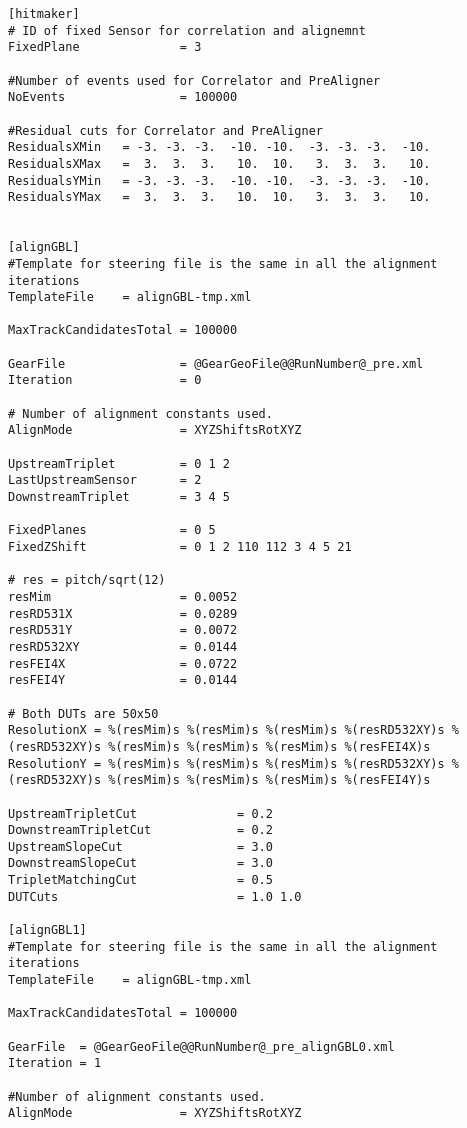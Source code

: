 \begin{lstlisting}[caption={Configuration file of EUTelescope for the testbeam anaylsis of June 2020 Batch 3}]
[hitmaker]
# ID of fixed Sensor for correlation and alignemnt
FixedPlane              = 3

#Number of events used for Correlator and PreAligner
NoEvents                = 100000

#Residual cuts for Correlator and PreAligner
ResidualsXMin   = -3. -3. -3.  -10. -10.  -3. -3. -3.  -10.
ResidualsXMax   =  3.  3.  3.   10.  10.   3.  3.  3.   10.
ResidualsYMin   = -3. -3. -3.  -10. -10.  -3. -3. -3.  -10.
ResidualsYMax   =  3.  3.  3.   10.  10.   3.  3.  3.   10.


[alignGBL]
#Template for steering file is the same in all the alignment iterations
TemplateFile    = alignGBL-tmp.xml

MaxTrackCandidatesTotal = 100000

GearFile                = @GearGeoFile@@RunNumber@_pre.xml
Iteration               = 0

# Number of alignment constants used.
AlignMode               = XYZShiftsRotXYZ

UpstreamTriplet         = 0 1 2
LastUpstreamSensor      = 2
DownstreamTriplet       = 3 4 5

FixedPlanes             = 0 5
FixedZShift             = 0 1 2 110 112 3 4 5 21

# res = pitch/sqrt(12)
resMim                  = 0.0052
resRD531X               = 0.0289
resRD531Y               = 0.0072
resRD532XY              = 0.0144
resFEI4X                = 0.0722
resFEI4Y                = 0.0144

# Both DUTs are 50x50
ResolutionX = %(resMim)s %(resMim)s %(resMim)s %(resRD532XY)s %(resRD532XY)s %(resMim)s %(resMim)s %(resMim)s %(resFEI4X)s
ResolutionY = %(resMim)s %(resMim)s %(resMim)s %(resRD532XY)s %(resRD532XY)s %(resMim)s %(resMim)s %(resMim)s %(resFEI4Y)s

UpstreamTripletCut              = 0.2
DownstreamTripletCut            = 0.2
UpstreamSlopeCut                = 3.0
DownstreamSlopeCut              = 3.0
TripletMatchingCut              = 0.5
DUTCuts                         = 1.0 1.0

[alignGBL1]
#Template for steering file is the same in all the alignment iterations
TemplateFile    = alignGBL-tmp.xml

MaxTrackCandidatesTotal = 100000

GearFile  = @GearGeoFile@@RunNumber@_pre_alignGBL0.xml
Iteration = 1

#Number of alignment constants used.
AlignMode               = XYZShiftsRotXYZ


\end{lstlisting}

